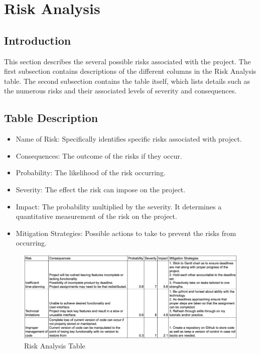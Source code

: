 \chapter{Risk Analysis}

\section{Introduction}
This section describes the several possible risks associated with the project. The first subsection contains descriptions of the different columns in the Risk Analysis table. The second subsection contains the table itself, which lists details such as the numerous risks and their associated levels of severity and consequences. 

\section{Table Description}
\begin{itemize}
	\item Name of Risk: Specifically identifies specific risks associated with project.
    \item Consequences: The outcome of the risks if they occur.
    \item Probability: The likelihood of the risk occurring.
    \item Severity: The effect the risk can impose on the project.
    \item Impact: The probability multiplied by the severity. It determines a quantitative measurement of the risk on the project.
    \item Mitigation Strategies: Possible actions to take to prevent the risks from occurring.
\end{itemize}

\begin{figure}[!ht]
	\centering
    \includegraphics[angle=270,scale=0.6]{riskTable}
    \caption{Risk Analysis Table}
\end{figure}